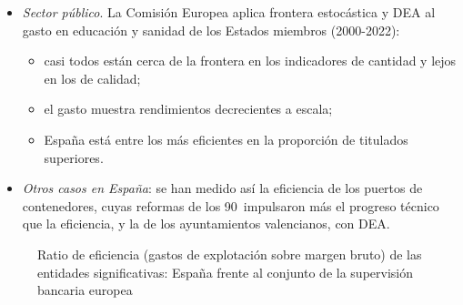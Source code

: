 \documentclass[11pt]{article}
\begin{document}
\begin{itemize}
\begin{itemize}
\begin{itemize}
    \end{itemize}
  \item \emph{Sector público}. La Comisión Europea aplica frontera estocástica y DEA al gasto en educación y sanidad de los Estados miembros (2000-2022)\nocite{ComisionEuropea2024EficienciaGasto}:
    \begin{itemize}
    \item casi todos están cerca de la frontera en los indicadores de cantidad y lejos en los de calidad;
    \item el gasto muestra rendimientos decrecientes a escala;
    \item España está entre los más eficientes en la proporción de titulados superiores.
    \end{itemize}
  \item \emph{Otros casos en España}: se han medido así la eficiencia de los puertos de contenedores, cuyas reformas de los 90~impulsaron más el progreso técnico que la eficiencia\nocite{GonzalezTrujillo2008Reforms}, y la de los ayuntamientos valencianos, con DEA\nocite{BalaguerCollPriorTortosa2007Determinants}.
  \end{itemize}
\end{itemize}

\begin{figure}[H]
\centering
\caption{Ratio de eficiencia (gastos de explotación sobre margen bruto) de las entidades significativas: España frente al conjunto de la supervisión bancaria europea}\label{fig:ratio-eficiencia}
\end{figure}
\end{document}

